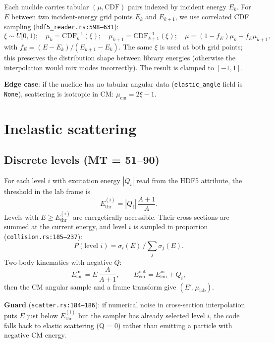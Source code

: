 \documentclass[11pt,a4paper]{article}
\begin{document}
Each nuclide carries tabular $(\mu, \mathrm{CDF})$ pairs indexed
by incident energy $E_k$. For $E$ between two incident-energy
grid points $E_k$ and $E_{k+1}$, we use correlated CDF sampling
(\texttt{hdf5\_reader.rs:598--631}):
\begin{equation}
\xi \sim U[0,1); \quad
\mu_k = \mathrm{CDF}^{-1}_k(\xi); \quad
\mu_{k+1} = \mathrm{CDF}^{-1}_{k+1}(\xi); \quad
\mu = (1 - f_E)\mu_k + f_E \mu_{k+1},
\end{equation}
with $f_E = (E - E_k)/(E_{k+1} - E_k)$. The same $\xi$ is used
at both grid points; this preserves the distribution shape
between library energies (otherwise the interpolation would
mix modes incorrectly). The result is clamped to $[-1, 1]$.

\textbf{Edge case}: if the nuclide has no tabular angular data
(\texttt{elastic\_angle} field is \texttt{None}), scattering is
isotropic in CM: $\mu_\text{cm} = 2\xi - 1$.

\section{Inelastic scattering}

\subsection{Discrete levels (MT = 51--90)}

For each level $i$ with excitation energy $|Q_i|$ read from the
HDF5 attribute, the threshold in the lab frame is
\begin{equation}
E_\text{thr}^{(i)} = |Q_i|\,\frac{A + 1}{A}.
\end{equation}
Levels with $E \geq E_\text{thr}^{(i)}$ are energetically
accessible. Their cross sections are summed at the current
energy, and level $i$ is sampled in proportion
(\texttt{collision.rs:185--237}):
\begin{equation}
P(\text{level } i) = \sigma_i(E)\, \Big/ \sum_j \sigma_j(E).
\end{equation}
Two-body kinematics with negative $Q$:
\begin{equation}
E_\text{cm}^\text{in} = E\,\frac{A}{A+1},
\qquad
E_\text{cm}^\text{out} = E_\text{cm}^\text{in} + Q_i,
\end{equation}
then the CM angular sample and a frame transform give
$(E', \mu_\text{lab})$.

\textbf{Guard} (\texttt{scatter.rs:184--186}): if numerical noise
in cross-section interpolation puts $E$ just below
$E_\text{thr}^{(i)}$ but the sampler has already selected level
$i$, the code falls back to elastic scattering (Q = 0) rather
than emitting a particle with negative CM energy.
\end{document}
